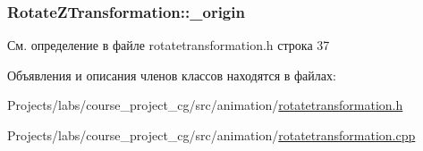 \subsubsection[{\texorpdfstring{\+\_\+origin}{_origin}}]{ Rotate\+Z\+Transformation\+::\+\_\+origin\hspace{0.3cm}{\ttfamily [protected]}}\hypertarget{class_rotate_z_transformation_a9b48a86a7982391293b8867f56897efa}{}\label{class_rotate_z_transformation_a9b48a86a7982391293b8867f56897efa}


См. определение в файле rotatetransformation.\+h строка 37



Объявления и описания членов классов находятся в файлах\+:\begin{DoxyCompactItemize}
\item 
Projects/labs/course\+\_\+project\+\_\+cg/src/animation/\hyperlink{rotatetransformation_8h}{rotatetransformation.\+h}\item 
Projects/labs/course\+\_\+project\+\_\+cg/src/animation/\hyperlink{rotatetransformation_8cpp}{rotatetransformation.\+cpp}\end{DoxyCompactItemize}
